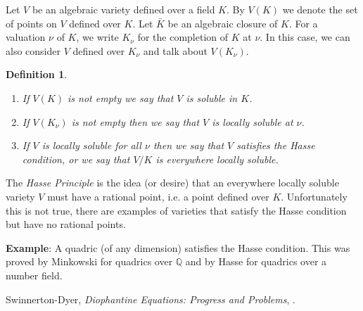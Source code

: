 \documentclass[12pt]{article}
\newtheorem{defn}{Definition}
\begin{document}
Let $V$ be an algebraic variety defined over a field $K$. By
$V(K)$ we denote the set of points on $V$ defined over $K$. Let
$\bar{K}$ be an algebraic closure of $K$. For a valuation $\nu$ of
$K$, we write $K_{\nu}$ for the completion of $K$ at $\nu$. In
this case, we can also consider $V$ defined over $K_{\nu}$ and
talk about $V(K_{\nu})$.

\begin{defn}\quad
\begin{enumerate}
\item If $V(K)$ is not empty we say that $V$ is \emph{soluble} in
$K$.

\item If $V(K_{\nu})$ is not empty then we say that $V$ is
\emph{locally soluble} at $\nu$.

\item If $V$ is locally soluble for all $\nu$ then we say that $V$
satisfies the \emph{Hasse condition}, or we say that $V/K$ is
\emph{everywhere locally soluble}.
\end{enumerate}
\end{defn}

The \emph{Hasse Principle} is the idea (or desire) that an
everywhere locally soluble variety $V$ must have a rational point,
i.e. a point defined over $K$. Unfortunately this is not true,
there are examples of varieties that satisfy the Hasse condition
but have no rational points.

{\bf Example}: A quadric (of any dimension) satisfies the Hasse
condition. This was proved by Minkowski for quadrics over
$\mathbb{Q}$ and by Hasse for quadrics over a number field.

\begin{thebibliography}{9}
 Swinnerton-Dyer, {\em Diophantine Equations: Progress and Problems}, .
\end{thebibliography}
\end{document}
